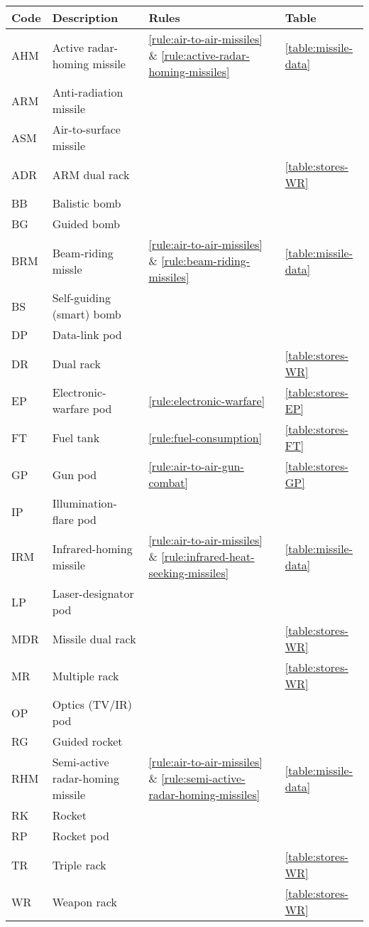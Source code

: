 \begin{twocolumntablefloat}[t]
\begin{twocolumntable}

\begin{tabular}{llll}
\toprule
Code&Description&Rules&Table\\
\midrule
AHM&Active radar-homing missile&\ref{rule:air-to-air-missiles} \& \ref{rule:active-radar-homing-missiles}&\ref{table:missile-data}\\
ARM&Anti-radiation missile\\
ASM&Air-to-surface missile\\
ADR&ARM dual rack&&\ref{table:stores-WR}\\
BB&Balistic bomb\\
BG&Guided bomb\\
BRM&Beam-riding missle&\ref{rule:air-to-air-missiles} \& \ref{rule:beam-riding-missiles}&\ref{table:missile-data}\\
BS&Self-guiding (smart) bomb\\
DP&Data-link pod\\
DR&Dual rack&&\ref{table:stores-WR}\\
EP&Electronic-warfare pod&\ref{rule:electronic-warfare}&\ref{table:stores-EP}\\
FT&Fuel tank&\ref{rule:fuel-consumption}&\ref{table:stores-FT}\\
GP&Gun pod&\ref{rule:air-to-air-gun-combat}&\ref{table:stores-GP}\\
IP&Illumination-flare pod\\
IRM&Infrared-homing missile&\ref{rule:air-to-air-missiles} \& \ref{rule:infrared-heat-seeking-missiles}&\ref{table:missile-data}\\
LP&Laser-designator pod\\
MDR&Missile dual rack&&\ref{table:stores-WR}\\
MR&Multiple rack&&\ref{table:stores-WR}\\
OP&Optics (TV/IR) pod\\
RG&Guided rocket\\
RHM&Semi-active radar-homing missile&\ref{rule:air-to-air-missiles} \& \ref{rule:semi-active-radar-homing-missiles}&\ref{table:missile-data}\\
RK&Rocket\\
RP&Rocket pod\\
TR&Triple rack&&\ref{table:stores-WR}\\
WR&Weapon rack&&\ref{table:stores-WR}\\
\bottomrule
\end{tabular}
\end{twocolumntable}
\end{twocolumntablefloat}
